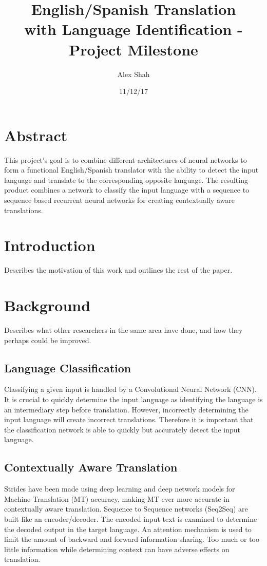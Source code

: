 \documentclass[10pt,a4paper]{report}
\begin{document}
\title{English/Spanish Translation \\ with Language Identification - \\ Project Milestone}
\author{Alex Shah}
\date{11/12/17}

\maketitle

\section{Abstract}
This project's goal is to combine different architectures of neural networks to form a functional English/Spanish translator with the ability to detect the input language and translate to the corresponding opposite language. The resulting product combines a network to classify the input language with a sequence to sequence based recurrent neural networks for creating contextually aware translations.

\clearpage

\section{Introduction} Describes the motivation of this work and outlines the rest of the paper.

\clearpage

\section{Background} Describes what other researchers in the same area have done,
and how they perhaps could be improved.

\subsection{Language Classification}
Classifying a given input is handled by a Convolutional Neural Network (CNN). It is crucial to quickly determine the input language as identifying the language is an intermediary step before translation. However, incorrectly determining the input language will create incorrect translations. Therefore it is important that the classification network is able to quickly but accurately detect the input language.

\subsection{Contextually Aware Translation}
Strides have been made using deep learning and deep network models for Machine Translation (MT) accuracy, making MT ever more accurate in contextually aware translation. Sequence to Sequence networks (Seq2Seq) are built like an encoder/decoder. The encoded input text is examined to determine the decoded output in the target language. An attention mechanism is used to limit the amount of backward and forward information sharing. Too much or too little information while determining context can have adverse effects on translation. 
\end{document}
